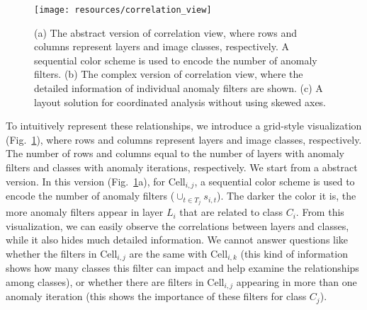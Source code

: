 \documentclass[format=acmsmall, review=false, screen=true]{acmart}
\newcommand{\ti}{\textcolor[rgb]{0,0,0}}
\begin{document}
\begin{figure}[t]
	\centering
	\texttt{[image: resources/correlation\_view]}
	\caption{ (a) The abstract version of correlation view, where rows and columns represent layers and image classes, respectively. A sequential color scheme is used to encode the number of anomaly filters. (b) The complex version of correlation view, where the detailed information of individual anomaly filters are shown. (c) A layout solution for coordinated analysis without using skewed axes. }
	\label{fig:correlation_view}
\end{figure}%
To intuitively represent these relationships, we introduce a grid-style visualization (Fig.~\ref{fig:correlation_view}), where rows and columns represent layers and image classes, respectively. The number of rows and columns equal to the number of layers with anomaly filters and classes with anomaly iterations, respectively.
\ti{
We start from a abstract version.
In this version (Fig.~\ref{fig:correlation_view}a), for $\mathrm{Cell}_{i,j}$, a sequential color scheme is used to encode the number of anomaly filters ($\cup_{t\in T_j}s_{i,t}$). 
The darker the color it is, the more anomaly filters appear in layer $L_i$ that are related to class $C_i$.
From this visualization, we can easily observe the correlations between layers and classes, while it also hides much detailed information.
We cannot answer questions like whether the filters in $\mathrm{Cell}_{i,j}$ are the same with $\mathrm{Cell}_{i,k}$ (this kind of information shows how many classes this filter can impact and help examine the relationships among classes), or whether there are filters in $\mathrm{Cell}_{i,j}$ appearing in more than one anomaly iteration (this shows the importance of these filters for class $C_j$).
}
\end{document}
